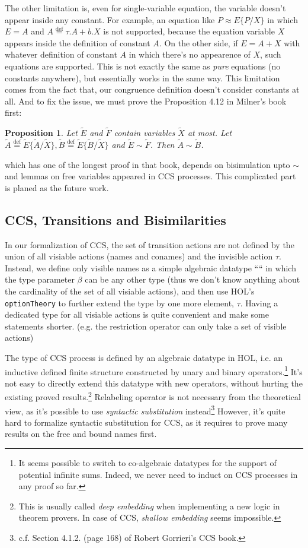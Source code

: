 \documentclass{eptcs} %
\newtheorem{proposition}[definition]{Proposition}
\begin{document}
The other limitation is, even for single-variable equation, the
variable doesn't appear inside any constant.  For example, an equation like
$P \approx E\{P/X\}$ in which $E = A$ and $A \overset{\mathrm{def}}{=}
\tau.A + b.X$ is not supported, because the equation variable $X$
appears inside the definition of constant $A$. On the other side, if
$E = A + X$ with whatever definition of constant $A$ in which there's
no appearence of $X$, such equations are supported. This is not
exactly the same as \emph{pure} equations (no constants anywhere), but
essentially works in the same way. This limitation comes from the fact
that, our congruence definition doesn't consider constants at all.
And to fix the issue, we must prove the Proposition 4.12 in Milner's
book first:
\begin{proposition}
Let $\tilde{E}$ and $\tilde{F}$ contain variables $\tilde{X}$ at
most. Let
$\tilde{A}\overset{\mathrm{def}}{=}\tilde{E}\{\tilde{A}/\tilde{X}\},
\tilde{B}\overset{\mathrm{def}}{=}\tilde{E}\{\tilde{B}/\tilde{X}\}$
and $\tilde{E}\sim\tilde{F}$. Then $\tilde{A}\sim\tilde{B}$.
\end{proposition}
which has one of the longest proof in that book, depends on bisimulation upto
$\sim$ and lemmas on free variables appeared in CCS
processes. This complicated part is planed as the future work.

\subsection{CCS, Transitions and Bisimilarities}

In our formalization of CCS, the set of transition actions are not
defined by the union of all visiable actions (names and conames) and the invisible
action $\tau$. Instead, we define only visible names as a simple
algebraic datatype ```` in which the type parameter
$\beta$ can be any other type (thus we don't know anything about the
cardinality of the set of all visiable actions), and then use HOL's
\texttt{optionTheory} to further extend the type by one more
element, $\tau$. Having a dedicated type for all visiable actions is quite
convenient and make some statements shorter. (e.g. the restriction
operator can only take a set of visible actions)

The type of CCS process is defined by an algebraic datatype in HOL,
i.e. an inductive defined finite structure constructed by unary and
binary operators.\footnote{It seems possible to switch to co-algebraic
datatypes for the support of potential infinite sums. Indeed, we never
need to induct on CCS processes in any proof so far.} 
It's not easy to directly extend this datatype with new operators,
without hurting the existing proved results.\footnote{This is usually
  called \emph{deep embedding} when implementing a new logic in theorem
  provers. In case of CCS, \emph{shallow embedding} seems impossible.}
Relabeling operator is not necessary from the theoretical view, as
it's possible to use \emph{syntactic
  substitution} instead\footnote{c.f. Section 4.1.2. (page 168) of Robert Gorrieri's CCS book.}
However, it's quite hard to formalize syntactic substitution for CCS,
as it requires to prove many results on the free and bound names
first.
\end{document}
